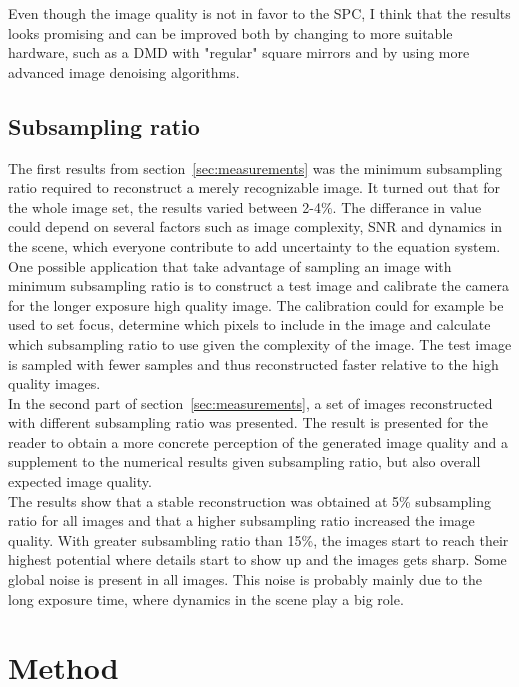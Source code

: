 Even though the image quality is not in favor to the SPC, I think that the results looks promising and can be improved both by changing to more suitable hardware, such as a DMD with "regular" square mirrors and by using more advanced image denoising algorithms.

\subsection{Subsampling ratio}
The first results from section~\ref{sec:measurements} was the minimum subsampling ratio required to reconstruct a merely recognizable image. It turned out that for the whole image set, the results varied between 2-4\%. The differance in value could depend on several factors such as image complexity, SNR and dynamics in the scene, which everyone contribute to add uncertainty to the equation system.\\[0.1in]

One possible application that take advantage of sampling an image with minimum subsampling ratio is to construct a test image and calibrate the camera for the longer exposure high quality image. The calibration could for example be used to set focus, determine which pixels to include in the image and calculate which subsampling ratio to use given the complexity of the image. The test image is sampled with fewer samples and thus reconstructed faster relative to the high quality images.\\[0.1in]

In the second part of section~\ref{sec:measurements}, a set of images reconstructed with different subsampling ratio was presented. The result is presented for the reader to obtain a more concrete perception of the generated image quality and a supplement to the numerical results given subsampling ratio, but also overall expected image quality.\\[0.1in]

The results show that a stable reconstruction was obtained at 5\% subsampling ratio for all images and that a higher subsampling ratio increased the image quality. With greater subsambling ratio than 15\%, the images start to reach their highest potential where details start to show up and the images gets sharp. Some global noise is present in all images. This noise is probably mainly due to the long exposure time, where dynamics in the scene play a big role. 

\section{Method} %

